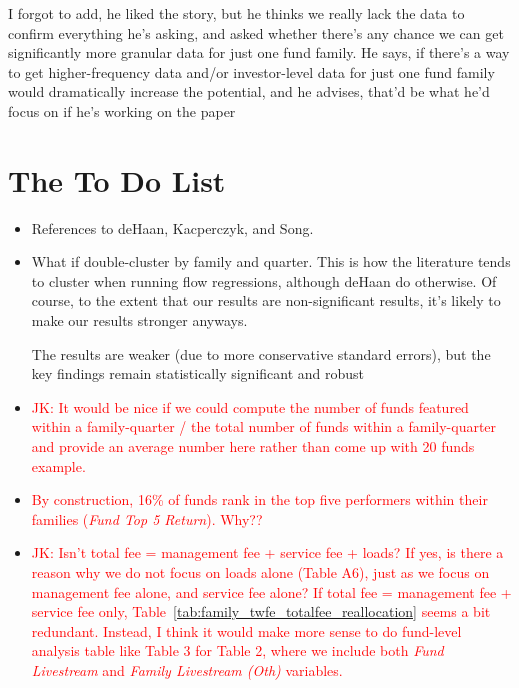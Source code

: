 \documentclass[12pt]{article}
\begin{document}
I forgot to add, he liked the story, but he thinks we really lack the data to confirm everything he's asking, and asked whether there's any chance we can get significantly more granular data for just one fund family. He says, if there's a way to get higher-frequency data and/or investor-level data for just one fund family would dramatically increase the potential, and he advises, that'd be what he'd focus on if he's working on the paper



\section*{The To Do List}

\begin{itemize}
    \item References to deHaan, Kacperczyk, and Song.
    \item What if double-cluster by family and quarter. This is how the literature tends to cluster when running flow regressions, although deHaan do otherwise. Of course, to the extent that our results are non-significant results, it's likely to make our results stronger anyways.
    
    The results are weaker (due to more conservative standard errors), but the key findings remain statistically significant and robust

    \item  \textcolor{red}{JK: It would be nice if we could compute the number of funds featured within a family-quarter / the total number of funds within a family-quarter and provide an average number here rather than come up with 20 funds example.}

    \item \textcolor{red}{By construction, 16\% of funds rank in the top five performers within their families (\textit{Fund Top 5 Return}). Why??}

    \item \textcolor{red}{JK: Isn't total fee = management fee + service fee + loads? If yes, is there a reason why we do not focus on loads alone (Table A6), just as we focus on management fee alone, and service fee alone? If total fee = management fee + service fee only, Table~\ref{tab:family_twfe_totalfee_reallocation} seems a bit redundant. Instead, I think it would make more sense to do fund-level analysis table like Table 3 for Table 2, where we include both \textit{Fund Livestream} and \textit{Family Livestream (Oth)} variables.}



\end{itemize}
\end{document}
